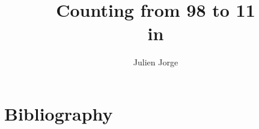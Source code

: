 \documentclass{book}
\title{Counting from 98 to \cancel{20} 11 \\ in \Cpp{}}
\author{Julien Jorge}
\begin{document}
\frontmatter


\cleardoublepage
{}
\tableofcontents




\mainmatter




\chapter{Bibliography}



\appendix

\end{document}
